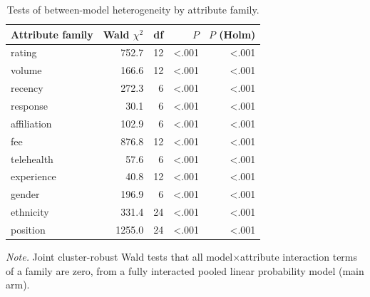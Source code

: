 \begin{table}[tbp]
\centering
\caption{Tests of between-model heterogeneity by attribute family.}
\label{tab:S_het_tests}
\begin{tabular}{lrrrr}
\toprule
Attribute family & Wald $\chi^2$ & df & $P$ & $P$ (Holm) \\
\midrule
rating & 752.7 & 12 & <.001 & <.001 \\
volume & 166.6 & 12 & <.001 & <.001 \\
recency & 272.3 & 6 & <.001 & <.001 \\
response & 30.1 & 6 & <.001 & <.001 \\
affiliation & 102.9 & 6 & <.001 & <.001 \\
fee & 876.8 & 12 & <.001 & <.001 \\
telehealth & 57.6 & 6 & <.001 & <.001 \\
experience & 40.8 & 12 & <.001 & <.001 \\
gender & 196.9 & 6 & <.001 & <.001 \\
ethnicity & 331.4 & 24 & <.001 & <.001 \\
position & 1255.0 & 24 & <.001 & <.001 \\
\bottomrule
\end{tabular}


\smallskip
\parbox{0.8\textwidth}{\footnotesize\textit{Note.} Joint cluster-robust Wald tests that all model$\times$attribute interaction terms of a family are zero, from a fully interacted pooled linear probability model (main arm).}
\end{table}
